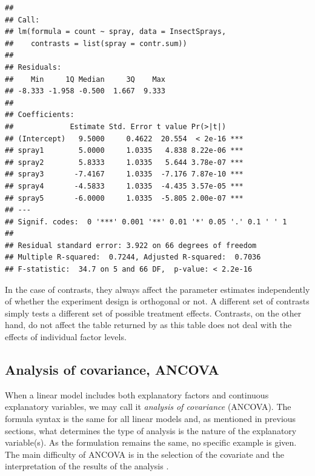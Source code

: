\documentclass[krantz2]{krantz}\usepackage{knitr}
\begin{document}
\begin{warningbox}
\begin{knitrout}\footnotesize
{}\color{fgcolor}\begin{kframe}
\begin{alltt}
\end{alltt}
\begin{verbatim}
##
## Call:
## lm(formula = count ~ spray, data = InsectSprays, 
##    contrasts = list(spray = contr.sum))
##
## Residuals:
##    Min     1Q Median     3Q    Max
## -8.333 -1.958 -0.500  1.667  9.333
##
## Coefficients:
##             Estimate Std. Error t value Pr(>|t|)
## (Intercept)   9.5000     0.4622  20.554  < 2e-16 ***
## spray1        5.0000     1.0335   4.838 8.22e-06 ***
## spray2        5.8333     1.0335   5.644 3.78e-07 ***
## spray3       -7.4167     1.0335  -7.176 7.87e-10 ***
## spray4       -4.5833     1.0335  -4.435 3.57e-05 ***
## spray5       -6.0000     1.0335  -5.805 2.00e-07 ***
## ---
## Signif. codes:  0 '***' 0.001 '**' 0.01 '*' 0.05 '.' 0.1 ' ' 1
##
## Residual standard error: 3.922 on 66 degrees of freedom
## Multiple R-squared:  0.7244,	Adjusted R-squared:  0.7036
## F-statistic:  34.7 on 5 and 66 DF,  p-value: < 2.2e-16
\end{verbatim}
\end{kframe}
\end{knitrout}

In the case of contrasts, they always affect the parameter estimates independently of whether the experiment design is orthogonal or not. A different set of contrasts simply tests a different set of possible treatment effects. Contrasts, on the other hand, do not affect the table returned by  as this table does not deal with the effects of individual factor levels.
\end{warningbox}

\subsection{Analysis of covariance, ANCOVA}

When a linear model includes both explanatory factors and continuous explanatory variables, we may call it \emph{analysis of covariance} (ANCOVA). The formula syntax is the same for all linear models and, as mentioned in previous sections, what determines the type of analysis is the nature of the explanatory variable(s). As the formulation remains the same, no specific example is given. The main difficulty of ANCOVA is in the selection of the covariate and the interpretation of the results of the analysis \autocite[e.g.][]{Smith1957}.
\end{document}
